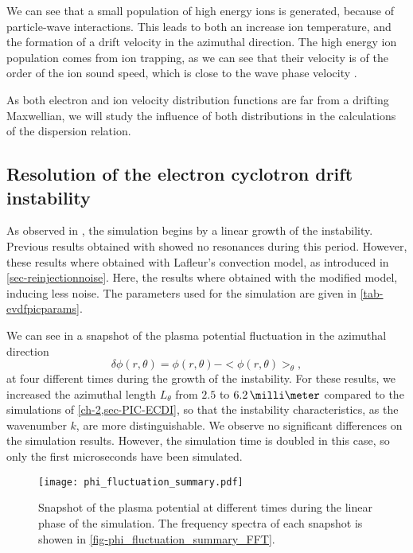  We can see that a small population of high energy ions is generated, because of particle-wave interactions.
  This leads to both an increase ion temperature, and the formation of a drift velocity in the azimuthal direction.
  The high energy ion population comes from ion trapping, as we can see that their velocity is of the order of the ion sound speed, which is close to the wave phase velocity \citep{lafleur2018}.
  
  As both electron and ion velocity distribution functions are far from a drifting Maxwellian, we will study the influence of both distributions in the calculations of the dispersion relation.
  
  
  \subsection{Resolution of the electron cyclotron drift instability} \label{subsec-ECDIPIC}
  
  
    As observed in , the simulation begins by a linear growth of the instability.
    Previous results obtained with \LPPic \citep{croes2017a} showed no resonances during this period.
    However, these results where obtained with Lafleur's convection model, as introduced in \cref{sec-reinjectionnoise}.
    Here, the results where obtained with the modified model, inducing less noise.
    The parameters used for the simulation are given in \cref{tab-evdfpicparams}.
    
    We can see in   a snapshot of the plasma potential fluctuation in the azimuthal direction \[ \delta \phi(r, \theta) = \phi(r, \theta) - < \phi(r, \theta) >_{ \theta}, \]
    at four different times during the growth of the instability.
    For these results, we increased the azimuthal length $L_{\theta}$ from $2.5$ to $6.2\,\milli\meter$ compared to the simulations of \cref{ch-2,sec-PIC-ECDI}, so that the instability characteristics, as the wavenumber $k$, are more distinguishable.
    We observe no significant differences on the simulation results.
    However, the simulation time is doubled in this case, so only the first microseconds have been simulated.
    

    
    \begin{figure}[!hbt]
      \centering
      \texttt{[image: phi\_fluctuation\_summary.pdf]}
      \caption{Snapshot of the plasma potential at different times during the linear phase of the simulation. The frequency spectra of each snapshot is showen in \cref{fig-phi_fluctuation_summary_FFT}. }
      \label{fig-phi_fluctuation_summary}
    \end{figure}
    
